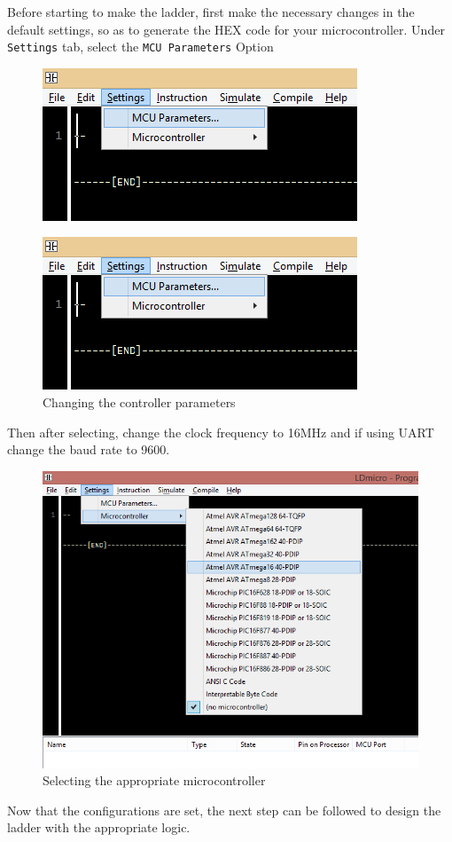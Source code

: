 \documentclass[12pt]{article}
\begin{document}
\vspace{12pt}Before starting to make the ladder, first make the necessary changes in the default settings, so as to generate the HEX code for your microcontroller.\vspace{12pt}
\newpage
Under \texttt{Settings} tab, select the \texttt{MCU Parameters} Option
\begin{figure}[h!]
\centering
\includegraphics[scale=1]{prop.png}
\end{figure}
\begin{figure}[h!]
\centering
\includegraphics[scale=0.8]{Setup.png}
\caption{Changing the controller parameters}
\end{figure}
\newpage
Then after selecting, change the clock frequency to 16MHz and if using UART change the baud rate to 9600.
\begin{figure}[h!]
\centering
\includegraphics[scale=0.8]{cont.png}
\caption{Selecting the appropriate microcontroller}
\end{figure}
\newpage
Now that the configurations are set, the next step can be followed to design the ladder with the appropriate logic.
\end{document}
